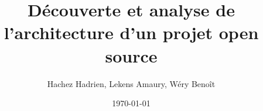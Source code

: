 

\title{Découverte et analyse de l'architecture d'un projet open source}
\author{Hachez Hadrien, Lekens Amaury, Wéry Benoît}
\date{\today}


\maketitle
\tableofcontents









